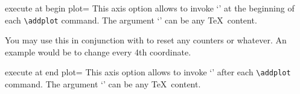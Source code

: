 \begin{pgfplotskey}{execute at begin plot=}
This axis option allows to invoke `' at the beginning of each \lstinline!\addplot! command. The argument `' can be any \TeX\ content.

You may use this in conjunction with  to reset any counters or whatever. An example would be to change every 4th coordinate.
\end{pgfplotskey}

\begin{pgfplotskey}{execute at end plot=}
This axis option allows to invoke `' after each \lstinline!\addplot! command. The argument `' can be any \TeX\ content.
\end{pgfplotskey}
